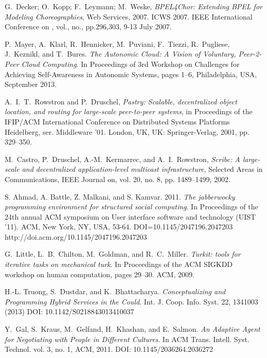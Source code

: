 \documentclass{llncs}
\begin{document}
\begin{thebibliography}{1}
G.~Decker; O.~Kopp; F.~Leymann; M.~Weske, \emph{BPEL4Chor: Extending BPEL for Modeling Choreographies}, Web Services, 2007. ICWS 2007. IEEE International Conference on , vol., no., pp.296,303, 9-13 July 2007.





P.~Mayer, A.~Klarl, R.~Hennicker, M.~Puviani, F.~Tiezzi, R.~Pugliese, J.~Keznikl, and T.~Bures. \emph{The Autonomic Cloud: A Vision of Voluntary, Peer-2-Peer Cloud Computing}. In Proceedings of 3rd Workshop on Challenges for Achieving Self-Awareness in Autonomic Systems, pages 1–6, Philadelphia, USA, September 2013.

A.~I.~T.~Rowstron and P.~Druschel, \emph{Pastry: Scalable, decentralized object location, and routing for large-scale peer-to-peer systems}, in Proceedings of the IFIP/ACM International Conference on Distributed Systems Platforms Heidelberg, ser. Middleware ’01. London, UK, UK: Springer-Verlag, 2001, pp. 329–350.

M.~Castro, P.~Druschel, A.-M.~Kermarrec, and A.~I.~Rowstron, \emph{Scribe: A large-scale and decentralized application-level multicast infrastructure}, Selected Areas in Communications, IEEE Journal on, vol. 20, no. 8, pp. 1489–1499, 2002.

S. Ahmad, A. Battle, Z. Malkani, and S. Kamvar. 2011. \emph{The jabberwocky programming environment for structured social computing}. In Proceedings of the 24th annual ACM symposium on User interface software and technology (UIST '11). ACM, New York, NY, USA, 53-64. DOI=10.1145/2047196.2047203 http://doi.acm.org/10.1145/2047196.2047203

G.~Little, L.~B.~Chilton, M.~Goldman, and R.~C.~Miller. \emph{Turkit: tools for iterative tasks on mechanical turk}. In Proceedings of the ACM SIGKDD workshop on human computation, pages 29–30. ACM, 2009.

 H.-L. Truong, S.~Dustdar, and K.~Bhattacharya. \emph{Conceptualizing and Programming Hybrid Services in the Could}. Int. J. Coop. Info. Syst. 22, 1341003 (2013) DOI: 10.1142/S0218843013410037

Y.~Gal, S.~Kraus, M.~Gelfand, H.~Khashan, and E.~Salmon. \emph{An Adaptive Agent for Negotiating with People in Different Cultures}. In  ACM Trans. Intell. Syst. Technol. vol. 3, no. 1, ACM, 2011. DOI: 10.1145/2036264.2036272

\end{thebibliography}
\end{document}
